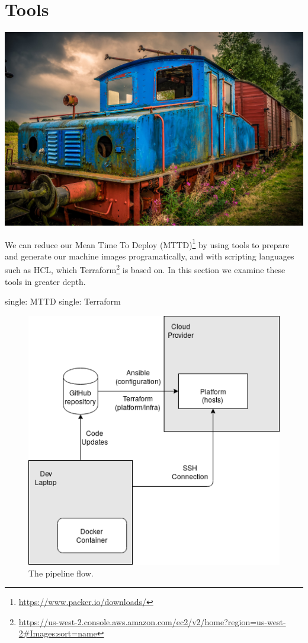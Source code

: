 \makeatletter
{}
\renewcommand{\thefigure}{\thechapter.\@arabic\c@figure}
\makeatother

\hypertarget{tools}{%
\section{Tools}\label{tools}}

\includegraphics{../images/railway-4101305_1920.jpg}

We can reduce our Mean Time To Deploy (MTTD)\footnote{\url{https://www.packer.io/downloads/}}
by using tools to prepare and generate our machine images
programatically, and with scripting languages such as HCL, which
Terraform\footnote{\url{https://us-west-2.console.aws.amazon.com/ec2/v2/home?region=us-west-2\#Images:sort=name}}
is based on. In this section we examine these tools in greater depth.

single: MTTD single: Terraform

\begin{figure}
\centering
\includegraphics{../images/infra_flow.png}
\caption{The pipeline flow.}
\end{figure}

